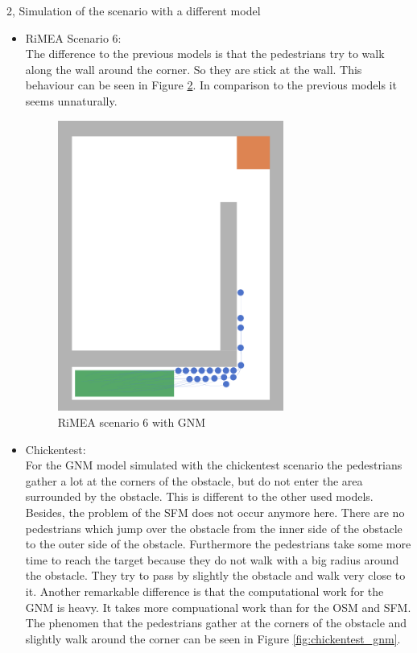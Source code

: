 \documentclass[10pt,a4paper]{article}
\begin{document}
\begin{task}{2, Simulation of the scenario with a different model}
\begin{itemize}
\begin{figure}[H]
        \caption{RiMEA scenario 1 with GNM}
        \label{fig:rimea1_gnm}
    \end{figure}
    \item RiMEA Scenario 6:\\
    The difference to the previous models is that the pedestrians try to walk along the wall around the corner. So they are stick at the wall. This behaviour can be seen in Figure \ref{fig:rimea6_gnm}. In comparison to the previous models it seems unnaturally.
    \begin{figure}[H]
        \centering
        \includegraphics[width=0.7\textwidth]{pictures/gnm/rimeatest6.png}
        \caption{RiMEA scenario 6 with GNM}
        \label{fig:rimea6_gnm}
    \end{figure}
    \item Chickentest:\\
    For the GNM model simulated with the chickentest scenario the pedestrians gather a lot at the corners of the obstacle, but do not enter the area surrounded by the obstacle. This is different to the other used models. Besides, the problem of the SFM does not occur anymore here. There are no pedestrians which jump over the obstacle from the inner side of the obstacle to the outer side of the obstacle. Furthermore the pedestrians take some more time to reach the target because they do not walk with a big radius around the obstacle. They try to pass by slightly the obstacle and walk very close to it. Another remarkable difference is that the computational work for the GNM is heavy. It takes more compuational work than for the OSM and SFM. The phenomen that the pedestrians gather at the corners of the obstacle and slightly walk around the corner can be seen in Figure \ref{fig:chickentest_gnm}.

\end{itemize}
\end{task}
\end{document}
